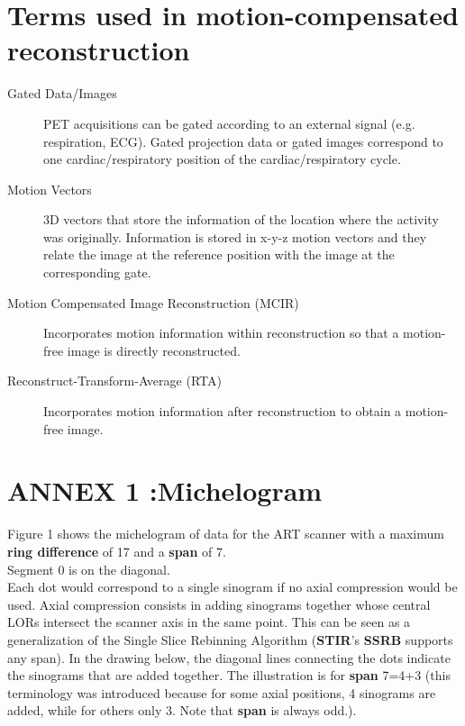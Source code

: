 \documentclass{article}
\begin{document}
\section*{Terms used in motion-compensated reconstruction}

\begin{description}
\item[Gated Data/Images]
PET acquisitions can be gated according to an external signal (e.g. respiration, ECG). Gated projection data or gated images correspond to one cardiac/respiratory position of the cardiac/respiratory cycle. 


\item[Motion Vectors]
3D vectors that store the information of the location where the activity was originally. Information is stored in x-y-z motion vectors and they relate the image at the reference position with the image at the corresponding gate.


\item[Motion Compensated Image Reconstruction (MCIR)]
Incorporates motion information within reconstruction so that a motion-free image is directly reconstructed. 

\item[Reconstruct-Transform-Average (RTA)]
Incorporates motion information after reconstruction to obtain a motion-free image.
\end{description}

\newpage
 \section*{ ANNEX 1 :Michelogram}

Figure 1 shows the michelogram of data for the ART scanner with a maximum \textbf{ring 
difference} of 17 and a \textbf{span} of 7. \\
Segment 0 is on the diagonal. \\
Each dot would correspond to a single sinogram if no axial compression 
would be used. Axial compression consists in adding sinograms 
together whose central LORs intersect the scanner axis 
in the same point. This can be seen as a generalization of the 
Single Slice Rebinning Algorithm (\textbf{STIR}'s \textbf{SSRB} supports any span). 
In the drawing below, the diagonal 
lines connecting the dots indicate the sinograms that are added 
together. The illustration is for \textbf{span} 7=4+3 (this terminology 
was introduced because for some axial positions, 4 sinograms 
are added, while for others only 3. Note that \textbf{span} is always 
odd.).
\end{document}
